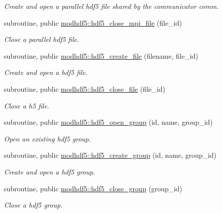 \begin{DoxyCompactItemize}
\begin{DoxyCompactList}\small\item\em Create and open a \textquotesingle{}parallel\textquotesingle{} hdf5 file shared by the communicator comm. \end{DoxyCompactList}\item 
subroutine, public \hyperlink{namespacemodhdf5_a72cb805582425e8633c70c5db85df8bc}{modhdf5\+::hdf5\+\_\+close\+\_\+mpi\+\_\+file} (file\+\_\+id)
\begin{DoxyCompactList}\small\item\em Close a \textquotesingle{}parallel\textquotesingle{} hdf5 file. \end{DoxyCompactList}\item 
subroutine, public \hyperlink{namespacemodhdf5_a66cf3f318aafac811c2422f8155f7ae1}{modhdf5\+::hdf5\+\_\+create\+\_\+file} (filename, file\+\_\+id)
\begin{DoxyCompactList}\small\item\em Create and open a hdf5 file. \end{DoxyCompactList}\item 
subroutine, public \hyperlink{namespacemodhdf5_af70ee678ccdc5ce829431ebe909264a9}{modhdf5\+::hdf5\+\_\+close\+\_\+file} (file\+\_\+id)
\begin{DoxyCompactList}\small\item\em Close a h5 file. \end{DoxyCompactList}\item 
subroutine, public \hyperlink{namespacemodhdf5_ae547666d0167e2a78d6529e11c1faa92}{modhdf5\+::hdf5\+\_\+open\+\_\+group} (id, name, group\+\_\+id)
\begin{DoxyCompactList}\small\item\em Open an existing hdf5 group. \end{DoxyCompactList}\item 
subroutine, public \hyperlink{namespacemodhdf5_a5486f9c861f7b8ee2060015acf0169a4}{modhdf5\+::hdf5\+\_\+create\+\_\+group} (id, name, group\+\_\+id)
\begin{DoxyCompactList}\small\item\em Create and open a hdf5 group. \end{DoxyCompactList}\item 
subroutine, public \hyperlink{namespacemodhdf5_aba547bfdd3dc38385069b0885ab5d526}{modhdf5\+::hdf5\+\_\+close\+\_\+group} (group\+\_\+id)
\begin{DoxyCompactList}\small\item\em Close a hdf5 group. \end{DoxyCompactList}\item 

\end{DoxyCompactItemize}
